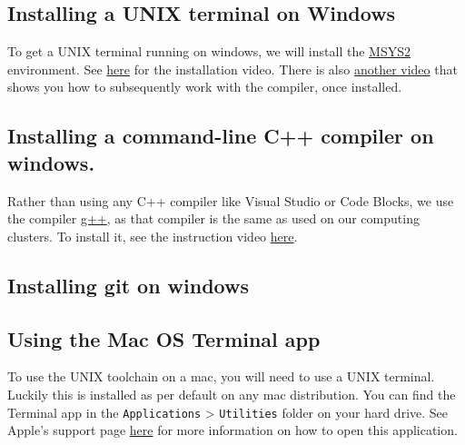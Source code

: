 \documentclass[
]{book}
\begin{document}
\hypertarget{installing-a-unix-terminal-on-windows}{%
\subsection{Installing a UNIX terminal on Windows}\label{installing-a-unix-terminal-on-windows}}

To get a UNIX terminal running on windows, we will install the \href{https://www.msys2.org/}{MSYS2} environment. See \href{https://recapexeter.cloud.panopto.eu/Panopto/Pages/Viewer.aspx?id=f2acdf3c-224e-49be-8ae3-ad2400f2b3c1\&start=0}{here} for the installation video. There is also \href{https://recapexeter.cloud.panopto.eu/Panopto/Pages/Viewer.aspx?id=376342e6-5791-4c25-b2e3-ad2400ffe304\&start=0}{another video} that shows you how to subsequently work with the compiler, once installed.

\hypertarget{installing-a-command-line-c-compiler-on-windows.}{%
\subsection{Installing a command-line C++ compiler on windows.}\label{installing-a-command-line-c-compiler-on-windows.}}

Rather than using any C++ compiler like Visual Studio or Code Blocks, we use the compiler \href{https://gcc.gnu.org/}{g++}, as that compiler is the same as used on our computing clusters. To install it, see the instruction video \href{https://recapexeter.cloud.panopto.eu/Panopto/Pages/Viewer.aspx?id=f2acdf3c-224e-49be-8ae3-ad2400f2b3c1\&start=0}{here}.

\hypertarget{installing-git-on-windows}{%
\subsection{Installing git on windows}\label{installing-git-on-windows}}

\hypertarget{MacTerminal}{%
\subsection{Using the Mac OS Terminal app}\label{MacTerminal}}

To use the UNIX toolchain on a mac, you will need to use a UNIX terminal. Luckily this is installed as per default on any mac distribution. You can find the Terminal app in the \texttt{Applications} \textgreater{} \texttt{Utilities} folder on your hard drive. See Apple's support page \href{https://support.apple.com/en-gb/guide/terminal/apd5265185d-f365-44cb-8b09-71a064a42125/mac}{here} for more information on how to open this application.
\end{document}
